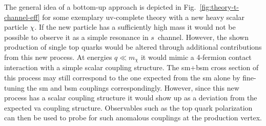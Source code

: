 The general idea of a bottom-up approach is depicted in Fig.~\ref{fig:theory-t-channel-eff} for some exemplary \gls{uv}-complete theory with a new heavy scalar particle $\chi$. If the new particle has a sufficiently high mass it would not be possible to observe it as a simple resonance in $s$~channel. However, the shown production of single top quarks would be altered through additional contributions from this new process. At energies $q\ll m_{\chi}$ it would mimic a 4-fermion contact interaction with a simple scalar coupling structure. The \mbox{\gls{sm}+\gls{bsm}} cross section of this process may still correspond to the one expected from the \gls{sm} alone by fine-tuning the \gls{sm} and \gls{bsm} couplings correspondingly. However, since this new process has a scalar coupling structure it would show up as a deviation from the expected \gls{va} coupling structure. Observables such as the top quark polarization can then be used to probe for such anomalous couplings at the production vertex.


